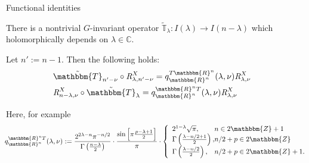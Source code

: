 \documentclass[pdf]{beamer}
\newcommand{\assign}{:=}
\newcommand{\OpR}{\mbox{\it R}}
\theoremstyle{mystyle}
\theoremstyle{remark}
\begin{document}
\begin{frame}{Functional identities}
	\begin{fact}
		There is a nontrivial $G$-invariant operator $\tilde{\mathbb{T}}_{\lambda}:I(\lambda)\to I(n-\lambda)$ which holomorphically depends on $\lambda\in \mathbb{C}$.
	\end{fact}
	\begin{theorem}
		Let $n':=n-1$. Then the following holds:
\begin{eqnarray}
	& \tilde{\mathbbm{T}}_{n' - \nu} \circ \OpR^X_{\lambda,n'-\nu}= q^{T\mathbbm{R}^n}_{\mathbbm{R}^n} (\lambda,
  \nu) \OpR^X_{\lambda,\nu} &  \nonumber\\
  & \OpR^X_{n-\lambda,\nu} \circ
  \tilde{\mathbbm{T}}_{\lambda} = q^{\mathbbm{R}^n T}_{\mathbbm{R}^n}
  (\lambda, \nu) \OpR^X_{\lambda,\nu} & \nonumber
\end{eqnarray}

\pause
Here, for example
\begin{equation*}
	\kern-0.1cm
  q^{\mathbbm{R}^n T}_{\mathbbm{R}^n} (\lambda, \nu) \assign \frac{2^{2
  \lambda - n} \pi^{- n / 2}}{\Gamma \left( \frac{n - \lambda}{2} \right)}
  \cdot \frac{\sin \left[ \pi \frac{p - \lambda + 1}{2} \right]}{\pi} \cdot
  \left\{ \begin{array}{l@{}l@{}}
    2^{1 - \lambda} \sqrt{\pi}, & n \in 2\mathbbm{Z}+ 1\\
    \Gamma \left( \frac{\lambda - n / 2 + 1}{2} \right), & n / 2 + p \in
    2\mathbbm{Z}\\
    \Gamma \left( \frac{\lambda - n / 2}{2} \right), & n / 2 + p \in
    2\mathbbm{Z}+ 1.
  \end{array} \right.
\end{equation*}
	\end{theorem}
\end{frame}
\begin{frame}
	{\footnotesize
}
\end{frame}
\end{document}
